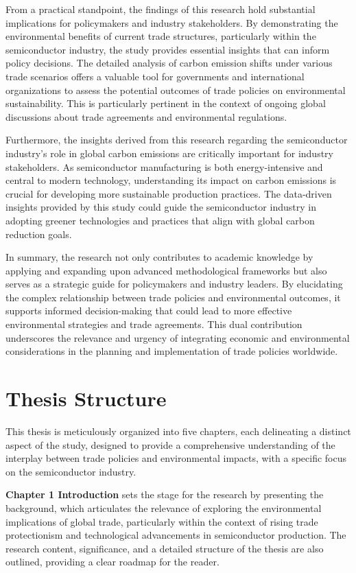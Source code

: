 From a practical standpoint, the findings of this research hold substantial implications for policymakers and industry stakeholders. By demonstrating the environmental benefits of current trade structures, particularly within the semiconductor industry, the study provides essential insights that can inform policy decisions. The detailed analysis of carbon emission shifts under various trade scenarios offers a valuable tool for governments and international organizations to assess the potential outcomes of trade policies on environmental sustainability. This is particularly pertinent in the context of ongoing global discussions about trade agreements and environmental regulations.

Furthermore, the insights derived from this research regarding the semiconductor industry's role in global carbon emissions are critically important for industry stakeholders. As semiconductor manufacturing is both energy-intensive and central to modern technology, understanding its impact on carbon emissions is crucial for developing more sustainable production practices. The data-driven insights provided by this study could guide the semiconductor industry in adopting greener technologies and practices that align with global carbon reduction goals.

In summary, the research not only contributes to academic knowledge by applying and expanding upon advanced methodological frameworks but also serves as a strategic guide for policymakers and industry leaders. By elucidating the complex relationship between trade policies and environmental outcomes, it supports informed decision-making that could lead to more effective environmental strategies and trade agreements. This dual contribution underscores the relevance and urgency of integrating economic and environmental considerations in the planning and implementation of trade policies worldwide.


\section{Thesis Structure}

This thesis is meticulously organized into five chapters, each delineating a distinct aspect of the study, designed to provide a comprehensive understanding of the interplay between trade policies and environmental impacts, with a specific focus on the semiconductor industry.

\textbf{Chapter 1 Introduction} sets the stage for the research by presenting the background, which articulates the relevance of exploring the environmental implications of global trade, particularly within the context of rising trade protectionism and technological advancements in semiconductor production. The research content, significance, and a detailed structure of the thesis are also outlined, providing a clear roadmap for the reader.


